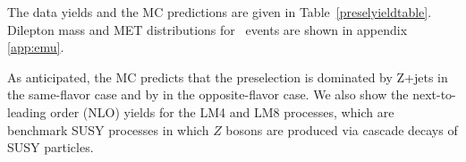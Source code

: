 

The data yields and the MC predictions are given in Table~\ref{preselyieldtable}.
Dilepton mass and MET distributions for \emu ~events are shown in appendix \ref{app:emu}.

As anticipated, the MC predicts that the preselection is dominated by Z+jets in the same-flavor 
case and by \ttbar in the opposite-flavor case.  
We also show the %
next-to-leading order (NLO) 
yields for the LM4 and LM8 processes, which are benchmark
SUSY processes in which $Z$ bosons are produced via cascade decays of SUSY particles. 




